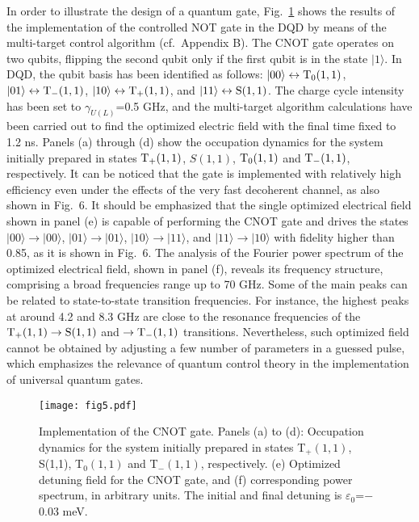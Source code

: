 \documentclass[prb,twocolumn,showpacs,floats]{revtex4}
\begin{document}
In order to illustrate the design of a quantum gate, Fig.~\ref{fig5} shows the results of the implementation of the controlled NOT gate in the DQD 
by means of the multi-target control algorithm (cf.~Appendix B).
The CNOT gate operates on two qubits, flipping the second qubit only if the first qubit is in the state $| 1 \rangle  $. In DQD, the qubit basis has been identified as follows: $| 00 \rangle\leftrightarrow{\rm T_0}(1,1)$, $| 01 \rangle\leftrightarrow{\rm T_-}(1,1)$, $| 10 \rangle\leftrightarrow{\rm T_+}(1,1)$, and $| 11 \rangle\leftrightarrow{\rm S}(1,1)$. The charge cycle intensity has been set to $\gamma_{U(L)}$=0.5 GHz, and the multi-target algorithm calculations have been carried out to find the optimized electric field with the final time fixed to 1.2 ns. Panels (a) through (d) show the occupation dynamics for the system initially prepared in states ${\rm T_+}(1,1)$, $S(1,1)$, ${\rm T_0}(1,1)$ and ${\rm T_-}(1,1)$, respectively. It can be noticed that the gate is implemented with relatively high efficiency even under the effects of the very fast decoherent channel, as
also shown in Fig.~6. It should be emphasized that the single optimized electrical field shown in panel (e) is capable of performing the CNOT gate and drives the states $| 00 \rangle \rightarrow | 00 \rangle$, $| 01 \rangle \rightarrow | 01 \rangle$, $| 10 \rangle \rightarrow | 11 \rangle$, and $| 11 \rangle \rightarrow | 10 \rangle$ with fidelity higher than 0.85, as it is shown in Fig.~6.
 The analysis of the Fourier power spectrum of the optimized electrical field, shown in panel (f), reveals its frequency structure, comprising a broad frequencies range up to 70 GHz. Some of the main peaks can be related to state-to-state transition frequencies. For instance, the highest peaks at around 4.2 and 8.3 GHz are close to the resonance frequencies of the
${\rm T_+(1,1)}\rightarrow {\rm S}(1,1)$ and $\rightarrow {\rm T_-}(1,1)$ transitions.
Nevertheless, such optimized field cannot be obtained by adjusting a few number of parameters in a guessed pulse, which emphasizes the relevance of quantum control theory in the implementation of universal quantum gates. 


\begin{figure}[htbp]
\texttt{[image: fig5.pdf]} 
\caption{Implementation of the CNOT gate.
Panels (a) to (d): Occupation dynamics for the system initially prepared in states T$_+(1,1)$, S(1,1), T$_0(1,1)$ and T$_-(1,1)$, respectively. (e) Optimized detuning field for the CNOT gate, and (f) corresponding power spectrum, in arbitrary units. The initial and final detuning is $\varepsilon_0$=$-$0.03 meV.}
\label{fig5}
\end{figure}
\end{document}
